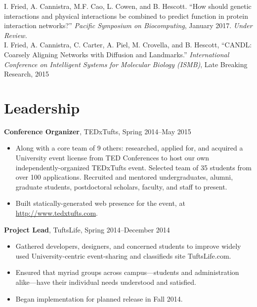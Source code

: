 \documentclass[10pt, letter]{article}
\begin{document}
I. Fried, A. Cannistra, M.F. Cao, L. Cowen, and B. Hescott. ``How should genetic interactions and physical interactions be combined to predict function in protein interaction networks?'' \emph{Pacific Symposium on Biocomputing}, January 2017. \emph{Under Review.}
\\

\noindent I. Fried, A. Cannistra, C. Carter, A. Piel, M. Crovella, and B. Hescott, ``CANDL: Coarsely Aligning Networks with Diffusion and Landmarks.'' \emph{International Conference on Intelligent Systems for Molecular Biology (ISMB)}, Late Breaking Research, 2015



\section*{Leadership}
{\bf Conference Organizer}, {TEDxTufts}, Spring 2014--May 2015\\
\vspace*{-.15in}
\begin{itemize}[topsep=0pt, itemsep=1pt]
  \item Along with a core team of 9 others: researched, applied for, and acquired a University event license from TED Conferences to host our own independently-organized TEDxTufts event. Selected team of 35 students from over 100 applications. Recruited and mentored undergraduates, alumni, graduate students, postdoctoral scholars, faculty, and staff to present.
  \item Built statically-generated web presence for the event, at \url{http://www.tedxtufts.com}.
\end{itemize}
\vspace{6pt}
{\bf Project Lead}, {TuftsLife}, Spring 2014--December 2014\\
\vspace*{-.15in}
\begin{itemize}[topsep=0pt, itemsep=-1pt]
\item Gathered developers, designers, and concerned students to improve widely used University-centric event-sharing and classifieds site TuftsLife.com.
\item Ensured that myriad groups across campus---students and administration alike---have their individual needs understood and satisfied.
\item Began implementation for planned release in Fall 2014.
\end{itemize}
\end{document}
